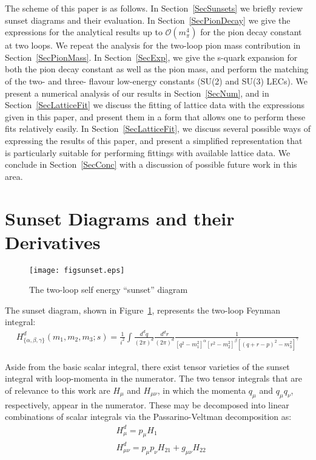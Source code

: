 \documentclass[12pt,a4paper]{article}
\begin{document}
The scheme of this paper is as follows. In Section~\ref{SecSunsets} we briefly review sunset diagrams and their evaluation. In Section~\ref{SecPionDecay} we give the expressions for the analytical results up to $\mathcal{O}(m_{\pi}^4)$ for the pion decay constant at two loops. We repeat the analysis for the two-loop pion mass contribution in Section~\ref{SecPionMass}. In Section~\ref{SecExp}, we give the s-quark expansion for both the pion decay constant as well as the pion mass, and perform the matching of the two- and three- flavour low-energy constants (SU(2) and SU(3) LECs). We present a numerical analysis of our results in Section~\ref{SecNum}, and in Section~\ref{SecLatticeFit} we discuss the fitting of lattice data with the expressions given in this paper, and present them in a form that allows one to perform these fits relatively easily. In Section~\ref{SecLatticeFit}, we discuss several possible ways of expressing the results of this paper, and present a simplified representation that is particularly suitable for performing fittings with available lattice data. We conclude in Section~\ref{SecConc} with a discussion of possible future work in this area.


\section{Sunset Diagrams and their Derivatives \label{SecSunsets}}

\begin{figure}[tb]
\centering
\texttt{[image: figsunset.eps]} 
\caption{The two-loop self energy ``sunset'' diagram}
\label{FigSunset}
\end{figure}

The sunset diagram, shown in Figure~\ref{FigSunset}, represents the two-loop Feynman integral:
\begin{align}
H_{\{\alpha,\beta,\gamma\}}^d (m_1,m_2,m_3;s) = \frac{1}{i^2} \int \frac{d^dq}{(2\pi)^d} \frac{d^dr}{(2\pi)^d} \frac{1}{[q^2-m_1^2]^{\alpha} [r^2-m_2^2]^{\beta} [(q+r-p)^2-m_3^2]^{\gamma}} 
\label{sunsetdef}
\end{align}

Aside from the basic scalar integral, there exist tensor varieties of the sunset integral with loop-momenta in the numerator. The two tensor integrals that are of relevance to this work are $H_{\mu}$ and $H_{\mu\nu}$, in which the momenta $q_{\mu}$ and $q_{\mu} q_{\nu}$, respectively, appear in the numerator. These may be decomposed into linear combinations of scalar integrals via the Passarino-Veltman decomposition as:
\begin{align}
	& H_{\mu}^d = p_{\mu} H_1 \nonumber \\
	& H_{\mu\nu}^d = p_{\mu}p_{\nu} H_{21} + g_{\mu\nu} H_{22} \label{H21}
\end{align}
\end{document}
